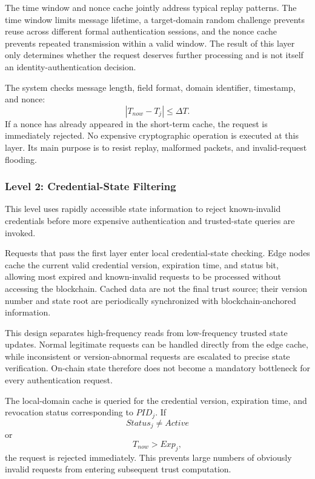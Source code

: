\documentclass[lettersize,journal]{IEEEtran}
\begin{document}
	The time window and nonce cache jointly address typical replay patterns. The time window limits message lifetime, a target-domain random challenge prevents reuse across different formal authentication sessions, and the nonce cache prevents repeated transmission within a valid window. The result of this layer only determines whether the request deserves further processing and is not itself an identity-authentication decision.
	
	The system checks message length, field format, domain identifier, timestamp, and nonce:
	\begin{equation}
		|T_{now}-T_j|\le\Delta T.
	\end{equation}
	If a nonce has already appeared in the short-term cache, the request is immediately rejected. No expensive cryptographic operation is executed at this layer. Its main purpose is to resist replay, malformed packets, and invalid-request flooding.
	
	\subsubsection{Level 2: Credential-State Filtering}
	This level uses rapidly accessible state information to reject known-invalid credentials before more expensive authentication and trusted-state queries are invoked.
	
	
	Requests that pass the first layer enter local credential-state checking. Edge nodes cache the current valid credential version, expiration time, and status bit, allowing most expired and known-invalid requests to be processed without accessing the blockchain. Cached data are not the final trust source; their version number and state root are periodically synchronized with blockchain-anchored information.
	
	This design separates high-frequency reads from low-frequency trusted state updates. Normal legitimate requests can be handled directly from the edge cache, while inconsistent or version-abnormal requests are escalated to precise state verification. On-chain state therefore does not become a mandatory bottleneck for every authentication request.
	
	The local-domain cache is queried for the credential version, expiration time, and revocation status corresponding to $PID_j$. If
	\begin{equation}
		Status_j\neq Active
	\end{equation}
	or
	\begin{equation}
		T_{now}>Exp_j,
	\end{equation}
	the request is rejected immediately. This prevents large numbers of obviously invalid requests from entering subsequent trust computation.
	
\end{document}
